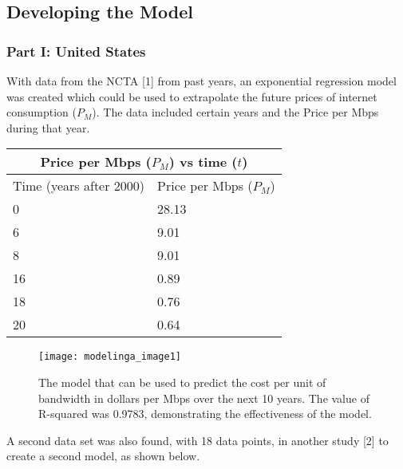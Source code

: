 	\subsection*{Developing the Model}
	\subsubsection*{Part I: United States}

	With data from the NCTA [1] from past years, an exponential regression model was created which could be used to extrapolate the future prices of internet consumption ($P_M$). The data included certain years and the Price per Mbps during that year.

    \begin{center}
    \begin{tabular}{|l|l|}
    \hline
    \multicolumn{2}{|c|}{Price per Mbps ($P_M$) vs time ($t$)} \\ \hline
    Time (years after 2000)     & Price per Mbps ($P_M$)     \\ \hline
    0                           & 28.13                   \\ \hline
    6                           & 9.01                    \\ \hline
    8                           & 9.01                    \\ \hline
    16                          & 0.89                    \\ \hline
    18                          & 0.76                    \\ \hline
    20                          & 0.64                    \\ \hline
    \end{tabular}
    \end{center}
	
	\renewcommand{\thefigure}{1}
    \begin{figure}[htp]
    \centering
    \begin{minipage}{9cm}
    \texttt{[image: modelinga\_image1]}
    \caption{The model that can be used to predict the cost per unit of bandwidth in dollars per Mbps over the next 10 years. The value of R-squared was 0.9783, demonstrating the effectiveness of the model.}
    \label{fig:1}
    \end{minipage}
    
    \end{figure}
    
    A second data set was also found, with 18 data points, in another study [2] to create a second model, as shown below.
    
